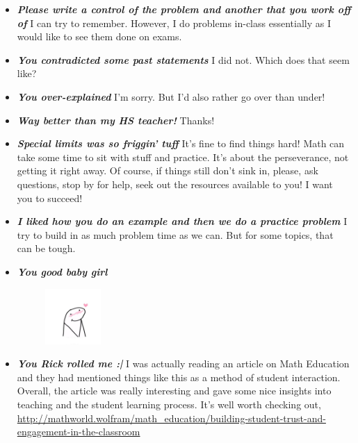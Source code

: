 \documentclass[11pt,letterpaper]{article}
\begin{document}
\begin{itemize}
\item {\bfseries\itshape Please write a control of the problem and another that you work off of} I can try to remember. However, I do problems in-class essentially as I would like to see them done on exams. 

\item {\bfseries\itshape You contradicted some past statements} I did not. Which does that seem like?

\item {\bfseries\itshape You over-explained} I'm sorry. But I'd also rather go over than under!

\item {\bfseries\itshape Way better than my HS teacher!} Thanks!

\item {\bfseries\itshape Special limits was so friggin' tuff} It's fine to find things hard! Math can take some time to sit with stuff and practice. It's about the perseverance, not getting it right away. Of course, if things still don't sink in, please, ask questions, stop by for help, seek out the resources available to you! I want you to succeed!

\item {\bfseries\itshape I liked how you do an example and then we do a practice problem} I try to build in as much problem time as we can. But for some topics, that can be tough. 

\item {\bfseries\itshape You good baby girl}
	\begin{figure}[H]
	\centering
	\includegraphics[width=0.20\textwidth]{images/blush.png}
	\end{figure}

\item {\bfseries\itshape You Rick rolled me :| } I was actually reading an article on Math Education and they had mentioned things like this as a method of student interaction. Overall, the article was really interesting and gave some nice insights into teaching and the student learning process. It's well worth checking out, \href{https://www.youtube.com/watch?v=dQw4w9WgXcQ}{http://mathworld.wolfram/math\_education/building-student-trust-and-engagement-in-the-classroom}


\end{itemize}
\end{document}
